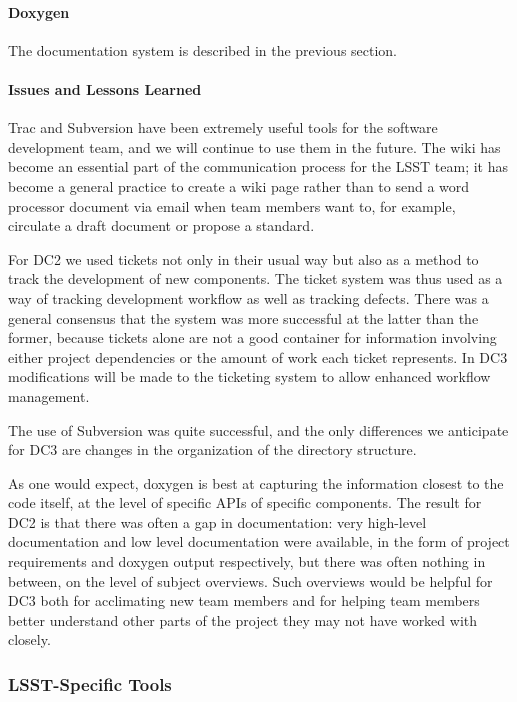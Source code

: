 \paragraph{Doxygen}

The  documentation system is described in the previous section.


\paragraph{Issues and Lessons Learned}

Trac and Subversion have been extremely useful tools for the software
development team, and we will continue to use them in the future. The wiki has
become an essential part of the communication process for the LSST team; it has
become a general practice to create a wiki page rather than to send a word
processor document via email when team members want to, for example, circulate a
draft document or propose a standard.

For DC2 we used tickets not only in their usual way but also as a method to
track the development of new components. The ticket system was thus used as a
way of tracking development workflow as well as tracking defects. There was a
general consensus that the system was more successful at the latter than the
former, because tickets alone are not a good container for information involving
either project dependencies or the amount of work each ticket represents. In
DC3 modifications will be made to the ticketing system to allow enhanced
workflow management.

The use of Subversion was quite successful, and the only differences we
anticipate for DC3 are changes in the organization of the directory structure.

As one would expect, doxygen is best at capturing the information closest to the
code itself, at the level of specific APIs of specific components. The result
for DC2 is that there was often a gap in documentation: very high-level
documentation and low level documentation were available, in the form of project
requirements and doxygen output respectively, but there was often nothing in
between, on the level of subject overviews. Such overviews would be helpful for
DC3 both for acclimating new team members and for helping team members better
understand other parts of the project they may not have worked with closely.

\subsubsection{LSST-Specific Tools}


